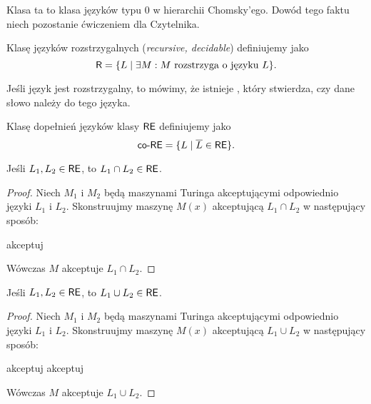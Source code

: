 Klasa ta to klasa języków typu 0 w hierarchii Chomsky'ego. Dowód tego faktu niech pozostanie ćwiczeniem dla Czytelnika.

\begin{definition}
    Klasę języków rozstrzygalnych (\textit{recursive, decidable}) definiujemy jako
    \[ \textsf{R} = \{L \mid \exists M : M \text{ rozstrzyga o języku } L \}. \]
\end{definition}

Jeśli język jest rozstrzygalny, to mówimy, że istnieje , który stwierdza, czy dane słowo należy do tego języka.

\begin{definition} Klasę dopełnień języków klasy $\textsf{RE}$ definiujemy jako
    \[ \textsf{co-RE} = \{L \mid \overline{L} \in \textsf{RE} \}. \]
\end{definition}

\begin{lemma}
    Jeśli $L_1, L_2 \in \textsf{RE}$, to $L_1 \cap L_2 \in \textsf{RE}$.
\end{lemma}
\begin{proof}
    Niech $M_1$ i $M_2$ będą maszynami Turinga akceptującymi odpowiednio języki $L_1$ i $L_2$. Skonstruujmy maszynę $M(x)$ akceptującą $L_1 \cap L_2$ w następujący sposób:
    \begin{algorithmic}
            \State akceptuj
        \EndIf
    \end{algorithmic}
    Wówczas $M$ akceptuje $L_1 \cap L_2$.
\end{proof}

\begin{lemma}\label{l:union of langugages in RE}
    Jeśli $L_1, L_2 \in \textsf{RE}$, to $L_1 \cup L_2 \in \textsf{RE}$.
\end{lemma}
\begin{proof}
    Niech $M_1$ i $M_2$ będą maszynami Turinga akceptującymi odpowiednio języki $L_1$ i $L_2$. Skonstruujmy maszynę $M(x)$ akceptującą $L_1 \cup L_2$ w następujący sposób:
    \begin{algorithmic}
                \State akceptuj
            \EndIf
                \State akceptuj
            \EndIf
        \EndFor
    \end{algorithmic}
    Wówczas $M$ akceptuje $L_1 \cup L_2$.
\end{proof}


